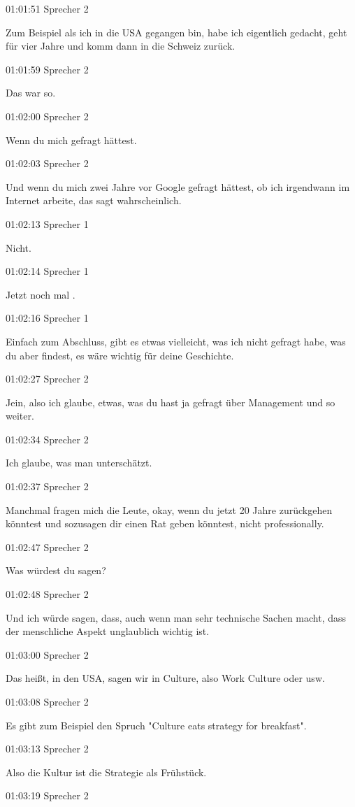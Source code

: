 01:01:51 Sprecher 2

Zum Beispiel als ich in die USA gegangen bin, habe ich eigentlich
gedacht, geht für vier Jahre und komm dann in die Schweiz zurück.

01:01:59 Sprecher 2

Das war so.

01:02:00 Sprecher 2

Wenn du mich gefragt hättest.

01:02:03 Sprecher 2

Und wenn du mich zwei Jahre vor Google gefragt hättest, ob ich
irgendwann im Internet arbeite, das sagt wahrscheinlich.

01:02:13 Sprecher 1

Nicht.

01:02:14 Sprecher 1

Jetzt noch mal .

01:02:16 Sprecher 1

Einfach zum Abschluss, gibt es etwas vielleicht, was ich nicht gefragt
habe, was du aber findest, es wäre wichtig für deine Geschichte.

01:02:27 Sprecher 2

Jein, also ich glaube, etwas, was du hast ja gefragt über Management und
so weiter.

01:02:34 Sprecher 2

Ich glaube, was man unterschätzt.

01:02:37 Sprecher 2

Manchmal fragen mich die Leute, okay, wenn du jetzt 20 Jahre zurückgehen
könntest und sozusagen dir einen Rat geben könntest, nicht
professionally.

01:02:47 Sprecher 2

Was würdest du sagen?

01:02:48 Sprecher 2

Und ich würde sagen, dass, auch wenn man sehr technische Sachen macht,
dass der menschliche Aspekt unglaublich wichtig ist.

01:03:00 Sprecher 2

Das heißt, in den USA, sagen wir in Culture, also Work Culture oder usw.

01:03:08 Sprecher 2

Es gibt zum Beispiel den Spruch "Culture eats strategy for breakfast".

01:03:13 Sprecher 2

Also die Kultur ist die Strategie als Frühstück.

01:03:19 Sprecher 2

